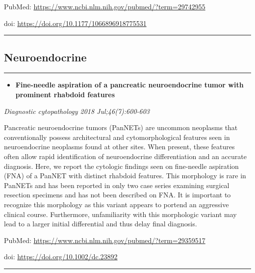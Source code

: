\documentclass[]{article}
\providecommand{\tightlist}{%
  \setlength{\itemsep}{0pt}\setlength{\parskip}{0pt}}
\begin{document}
PubMed: \url{https://www.ncbi.nlm.nih.gov/pubmed/?term=29742955}

doi: \url{https://doi.org/10.1177/1066896918775531}

{}

{}

\begin{center}\rule{0.5\linewidth}{\linethickness}\end{center}

\hypertarget{neuroendocrine}{%
\subsection{Neuroendocrine}\label{neuroendocrine}}

\begin{center}\rule{0.5\linewidth}{\linethickness}\end{center}

\begin{itemize}
\tightlist
\item
  \textbf{Fine-needle aspiration of a pancreatic neuroendocrine tumor
  with prominent rhabdoid features}
\end{itemize}

\emph{Diagnostic cytopathology 2018 Jul;46(7):600-603}

Pancreatic neuroendocrine tumors (PanNETs) are uncommon neoplasms that
conventionally possess architectural and cytomorphological features seen
in neuroendocrine neoplasms found at other sites. When present, these
features often allow rapid identification of neuroendocrine
differentiation and an accurate diagnosis. Here, we report the cytologic
findings seen on fine-needle aspiration (FNA) of a PanNET with distinct
rhabdoid features. This morphology is rare in PanNETs and has been
reported in only two case series examining surgical resection specimens
and has not been described on FNA. It is important to recognize this
morphology as this variant appears to portend an aggressive clinical
course. Furthermore, unfamiliarity with this morphologic variant may
lead to a larger initial differential and thus delay final diagnosis.

PubMed: \url{https://www.ncbi.nlm.nih.gov/pubmed/?term=29359517}

doi: \url{https://doi.org/10.1002/dc.23892}

{}

{}

\begin{center}\rule{0.5\linewidth}{\linethickness}\end{center}
\end{document}
